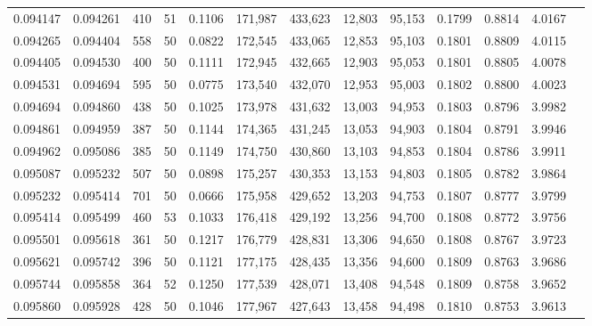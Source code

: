 \begin{tabular}{rrrrrrrrrrrrr}
0.094147 & 0.094261 &   410 &  51 &                                     0.1106 & 171,987 & 433,623 &  12,803 &  95,153 & 0.1799 & 0.8814 & 4.0167 \\
0.094265 & 0.094404 &   558 &  50 &                                     0.0822 & 172,545 & 433,065 &  12,853 &  95,103 & 0.1801 & 0.8809 & 4.0115 \\
0.094405 & 0.094530 &   400 &  50 &                                     0.1111 & 172,945 & 432,665 &  12,903 &  95,053 & 0.1801 & 0.8805 & 4.0078 \\
0.094531 & 0.094694 &   595 &  50 &                                     0.0775 & 173,540 & 432,070 &  12,953 &  95,003 & 0.1802 & 0.8800 & 4.0023 \\
0.094694 & 0.094860 &   438 &  50 &                                     0.1025 & 173,978 & 431,632 &  13,003 &  94,953 & 0.1803 & 0.8796 & 3.9982 \\
0.094861 & 0.094959 &   387 &  50 &                                     0.1144 & 174,365 & 431,245 &  13,053 &  94,903 & 0.1804 & 0.8791 & 3.9946 \\
0.094962 & 0.095086 &   385 &  50 &                                     0.1149 & 174,750 & 430,860 &  13,103 &  94,853 & 0.1804 & 0.8786 & 3.9911 \\
0.095087 & 0.095232 &   507 &  50 &                                     0.0898 & 175,257 & 430,353 &  13,153 &  94,803 & 0.1805 & 0.8782 & 3.9864 \\
0.095232 & 0.095414 &   701 &  50 &                                     0.0666 & 175,958 & 429,652 &  13,203 &  94,753 & 0.1807 & 0.8777 & 3.9799 \\
0.095414 & 0.095499 &   460 &  53 &                                     0.1033 & 176,418 & 429,192 &  13,256 &  94,700 & 0.1808 & 0.8772 & 3.9756 \\
0.095501 & 0.095618 &   361 &  50 &                                     0.1217 & 176,779 & 428,831 &  13,306 &  94,650 & 0.1808 & 0.8767 & 3.9723 \\
0.095621 & 0.095742 &   396 &  50 &                                     0.1121 & 177,175 & 428,435 &  13,356 &  94,600 & 0.1809 & 0.8763 & 3.9686 \\
0.095744 & 0.095858 &   364 &  52 &                                     0.1250 & 177,539 & 428,071 &  13,408 &  94,548 & 0.1809 & 0.8758 & 3.9652 \\
0.095860 & 0.095928 &   428 &  50 &                                     0.1046 & 177,967 & 427,643 &  13,458 &  94,498 & 0.1810 & 0.8753 & 3.9613 \\

\end{tabular}
